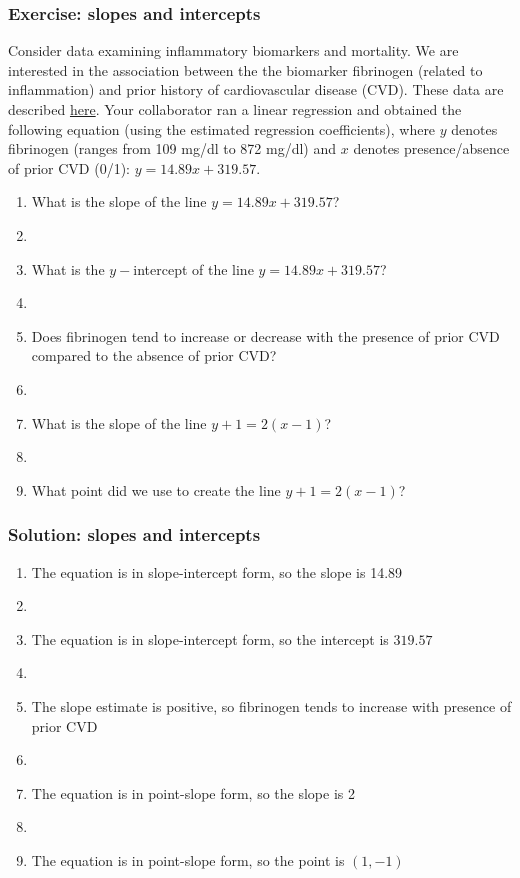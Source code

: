 \documentclass[11pt]{beamer}
\newcommand{\myframe}[1]{\begin{frame} \frametitle{#1}}
\begin{document}
\myframe{Exercise: slopes and intercepts}
Consider data examining inflammatory biomarkers and mortality. We are interested in the association between the the biomarker fibrinogen (related to inflammation) and prior history of cardiovascular disease (CVD). These data are described \href{https://www.emersonstatistics.com/datasets/inflamm.doc}{here}. Your collaborator ran a linear regression and obtained the following equation (using the estimated regression coefficients), where $y$ denotes fibrinogen (ranges from 109 mg/dl to 872 mg/dl) and $x$ denotes presence/absence of prior CVD (0/1): $y = 14.89x + 319.57$.
\begin{enumerate}
\item What is the slope of the line $y = 14.89x + 319.57$?
\item[]
\item What is the $y-$intercept of the line $y = 14.89x + 319.57$?
\item[]
\item Does fibrinogen tend to increase or decrease with the presence of prior CVD compared to the absence of prior CVD?
\item[]
\item What is the slope of the line $y + 1 = 2(x - 1)$?
\item[]
\item What point did we use to create the line $y + 1 = 2(x - 1)$?
\end{enumerate}
\end{frame}

\myframe{Solution: slopes and intercepts}
\begin{enumerate}
\item The equation is in slope-intercept form, so the slope is 14.89
\item[]
\item The equation is in slope-intercept form, so the intercept is $319.57$
\item[]
\item The slope estimate is positive, so fibrinogen tends to increase with presence of prior CVD
\item[]
\item The equation is in point-slope form, so the slope is 2
\item[]
\item The equation is in point-slope form, so the point is $(1, -1)$
\end{enumerate}
\end{frame}
\end{document}
